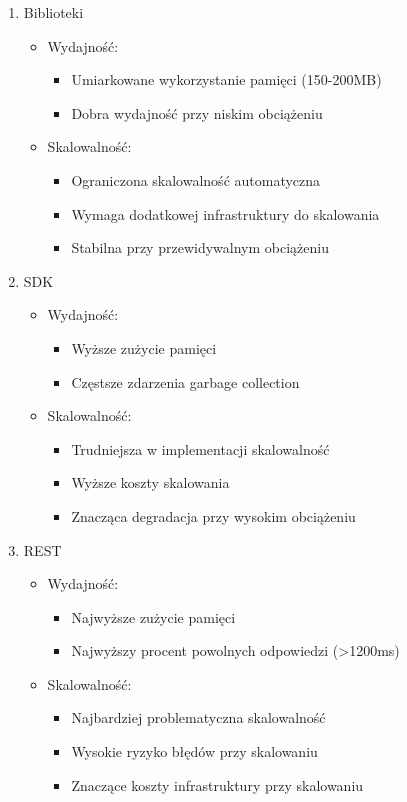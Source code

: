\documentclass[runningheads,12pt]{llncs}
\begin{document}
\begin{enumerate}
    \item Biblioteki
    \begin{itemize}
        \item Wydajność:
        \begin{itemize}
            \item Umiarkowane wykorzystanie pamięci (150-200MB)
            \item Dobra wydajność przy niskim obciążeniu
        \end{itemize}
        \item Skalowalność:
        \begin{itemize}
            \item Ograniczona skalowalność automatyczna
            \item Wymaga dodatkowej infrastruktury do skalowania
            \item Stabilna przy przewidywalnym obciążeniu
        \end{itemize}
    \end{itemize}

    \item SDK
    \begin{itemize}
        \item Wydajność:
        \begin{itemize}
            \item Wyższe zużycie pamięci
            \item Częstsze zdarzenia garbage collection
        \end{itemize}
        \item Skalowalność:
        \begin{itemize}
            \item Trudniejsza w implementacji skalowalność
            \item Wyższe koszty skalowania
            \item Znacząca degradacja przy wysokim obciążeniu
        \end{itemize}
    \end{itemize}

    \item REST
    \begin{itemize}
        \item Wydajność:
        \begin{itemize}
            \item Najwyższe zużycie pamięci
            \item Najwyższy procent powolnych odpowiedzi (>1200ms)
        \end{itemize}
        \item Skalowalność:
        \begin{itemize}
            \item Najbardziej problematyczna skalowalność
            \item Wysokie ryzyko błędów przy skalowaniu
            \item Znaczące koszty infrastruktury przy skalowaniu
        \end{itemize}
    \end{itemize}
\end{enumerate}
\end{document}
